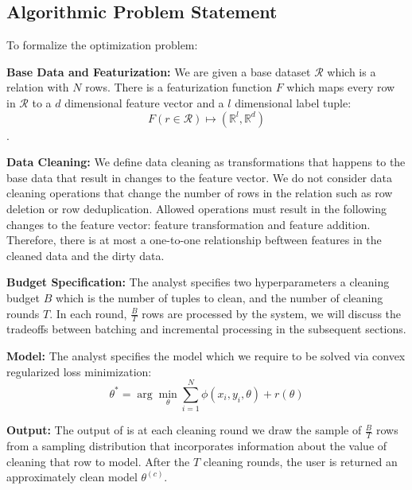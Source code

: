 \subsection{Algorithmic Problem Statement}
To formalize the optimization problem:

\noindent\textbf{Base Data and Featurization: } We are given a base dataset $\mathcal{R}$ which is a relation with $N$ rows. There is a featurization function $F$ which maps every row in $\mathcal{R}$ to a $d$ dimensional feature vector and a $l$ dimensional label tuple: \[F(r \in \mathcal{R}) \mapsto (\mathbb{R}^l, \mathbb{R}^d)\]. 

\noindent\textbf{Data Cleaning: } We define data cleaning as transformations that happens to the base data that result in changes to the feature vector. We do not consider data cleaning operations that change the number of rows in the relation such as row deletion or row deduplication. Allowed operations must result in the following changes to the feature vector: feature transformation and feature addition. Therefore, there is at most a one-to-one relationship beftween features in the cleaned data and the dirty data.


\noindent\textbf{Budget Specification: } The analyst specifies two hyperparameters a cleaning budget $B$ which is the number of tuples to clean, and the number of cleaning rounds $T$. In each round, $\frac{B}{T}$ rows are processed by the system, we will discuss the tradeoffs between batching and incremental processing in the subsequent sections.


\noindent\textbf{Model: } The analyst specifies the model which we require to be solved via convex regularized loss minimization:
\[
 \theta^{*}=\arg\min_{\theta}\sum_{i=1}^{N}\phi(x_{i},y_{i},\theta) + r(\theta)
\]

\noindent\textbf{Output: } The output of \sys is at each cleaning round we draw the sample of $\frac{B}{T}$ rows from a sampling distribution that incorporates information about the value of cleaning that row to model. After the $T$ cleaning rounds, the user is returned an approximately clean model $\theta^{(c)}$.
\fi
